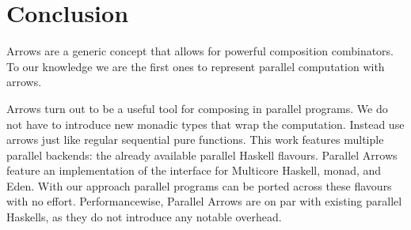 \section{Conclusion}
\label{sec:conclusion}
Arrows are a generic concept that allows for powerful composition combinators. To our knowledge we are the first ones to represent parallel computation with arrows.

Arrows turn out to be a useful tool for composing in parallel programs. We do not have to introduce new monadic types that wrap the computation. Instead use arrows just like regular sequential pure functions. 
%
This work features multiple parallel backends: the already available parallel Haskell flavours. Parallel Arrows feature an implementation of the  interface for Multicore Haskell,  monad, and Eden. With our approach parallel programs can be ported across these flavours with no effort.
%
%
Performancewise, Parallel Arrows are on par with existing parallel Haskells, as they do not introduce any notable overhead.



